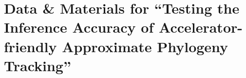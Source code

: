 \section*{Data \& Materials for ``Testing the Inference Accuracy of Accelerator-friendly Approximate Phylogeny Tracking''}

\setcounter{section}{0}
\setcounter{equation}{0}
\setcounter{figure}{0}
\setcounter{table}{0}

\makeatletter
\def\@seccntformat#1{\@ifundefined{#1@cntformat}%
   {\csname the#1\endcsname\space}%
   {\csname #1@cntformat\endcsname}}%
\newcommand\section@cntformat{\thesection\space} %
\makeatother
\renewcommand{\thesection}{A}







% 

% 
% 
% 
